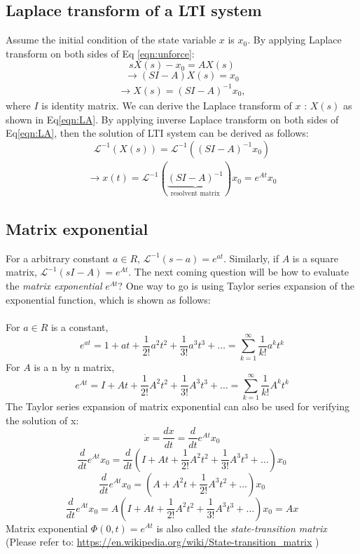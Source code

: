 \documentclass{article}
\begin{document}
\subsection{Laplace transform of a LTI system}
Assume the initial condition of the state variable $x$ is $x_0$. By applying Laplace transform on both sides of Eq \eqref{eqn:unforce}:
\[
sX(s)-x_0=AX(s)\]
\[\rightarrow(SI-A)X(s)=x_0\]
\begin{align}
\label{eqn:LA}
\rightarrow X(s)=(SI-A)^{-1}x_0,
\end{align}
where $I$ is identity matrix. We can derive the Laplace transform  of $x$ : $X(s)$ as shown in Eq\eqref{eqn:LA}. By applying inverse Laplace transform on both sides of Eq\eqref{eqn:LA}, then the solution of LTI system can be derived as follows:
\[
\mathscr{L}^{-1}(X(s))=\mathscr{L}^{-1}((SI-A)^{-1}x_0)\]
\begin{align}
\label{eqn:sol}
\rightarrow x(t)=\mathscr{L}^{-1}(\underbrace{(SI-A)^{-1}}_\text{resolvent matrix})x_0=e^{At}x_0
\end{align}

\subsection{Matrix exponential}
For a arbitrary constant $a\in R$, $\mathscr{L}^{-1}(s-a)=e^{at}$. Similarly, if $A$ is a square matrix, $\mathscr{L}^{-1}(sI-A)=e^{At}$. The next coming question will be how to evaluate the \emph {matrix exponential} $e^{At}$? One way to go is using Taylor series expansion of the exponential function, which is shown as follows:\\\\
For $a\in R$ is a constant,
\[e^{at}=1+at+\frac{1}{2!}a^2t^2+\frac{1}{3!}a^3t^3+\ldots=
\sum\limits_{k=1}^\infty \frac{1}{k!}a^kt^k\]
For $A$ is a n by n matrix,
\[e^{At}=I+At+\frac{1}{2!}A^2t^2+\frac{1}{3!}A^3t^3+\ldots=
\sum\limits_{k=1}^\infty \frac{1}{k!}A^kt^k\]
The Taylor series expansion of matrix exponential can also be used for verifying the solution of x:
\[\dot x=\frac{dx}{dt}=\frac{d}{dt}e^{At}x_0\]
\[\frac{d}{dt}e^{At}x_0=\frac{d}{dt}(I+At+\frac{1}{2!}A^2t^2+\frac{1}{3!}A^3t^3+\ldots)x_0\]
\[\frac{d}{dt}e^{At}x_0=(A+A^2t+\frac{1}{2!}A^3t^2+\ldots)x_0\]
\[\frac{d}{dt}e^{At}x_0=A(I+At+\frac{1}{2!}A^2t^2+\frac{1}{3!}A^3t^3+\ldots)x_0=Ax\]
Matrix exponential $\Phi(0,t)=e^{At}$ is also called the \emph{state-transition matrix}\\
(Please refer to: \url{https://en.wikipedia.org/wiki/State-transition_matrix} )
\end{document}
